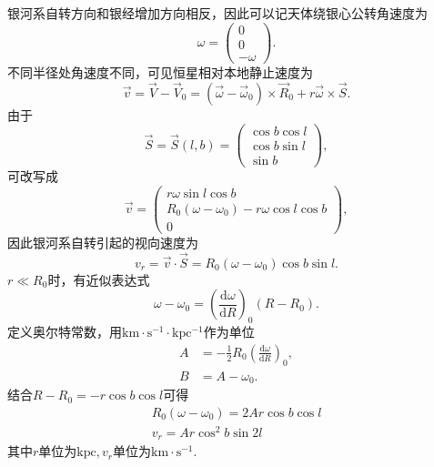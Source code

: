 \documentclass[11pt, a4paper, oneside]{ctexart}
\numberwithin{equation}{subsection}
\begin{document}
银河系自转方向和银经增加方向相反，因此可以记天体绕银心公转角速度为
\begin{equation}
\omega=\begin{pmatrix}
0\\
0\\
-\omega
\end{pmatrix}.
\end{equation}
不同半径处角速度不同，可见恒星相对本地静止速度为
\begin{equation}
\vec{v}=\vec{V}-\vec{V}_{0}=\left(\vec{\omega}-\vec{\omega}_{0}\right)\times\vec{R}_{0}+r\vec{\omega}\times\vec{S}.
\end{equation}
由于
\begin{equation}
\vec S=\vec S\left(l,b\right)=\begin{pmatrix}
\cos b\cos l\\
\cos b\sin l\\
\sin b
\end{pmatrix},
\end{equation}
可改写成
\begin{equation}
\vec v=\begin{pmatrix}
r\omega\sin l\cos b\\
R_0\left(\omega-\omega_0\right)-r\omega\cos l\cos b\\
0
\end{pmatrix},
\end{equation}
因此银河系自转引起的视向速度为
\begin{equation}
v_r=\vec v\cdot\vec S=R_0\left(\omega-\omega_0\right)\cos b\sin l.
\end{equation}
$r\ll R_{0}$时，有近似表达式
\begin{equation}
\omega-\omega_{0}=\left(\frac{\mathrm{d}\omega}{\mathrm{d}R}\right)_{0}\left(R-R_{0}\right).
\end{equation}
定义奥尔特常数，用$\mathrm{km\cdot{}s^{-1}\cdot kpc^{-1}}$作为单位
\begin{align}
A&=-\frac12R_0\left(\frac{\mathrm{d}\omega}{\mathrm{d}R}\right)_0,\\
B&=A-\omega_0.
\end{align}
结合$R-R_{0}=-r\cos b\cos l$可得
\begin{align}
R_0\left(\omega-\omega_0\right)=2Ar\cos b\cos l\\
v_r=Ar\cos^2b\sin2l
\end{align}
其中$r$单位为$\mathrm{kpc},v_r$单位为$\mathrm{km\cdot{}s^{-1}}$.
\end{document}
